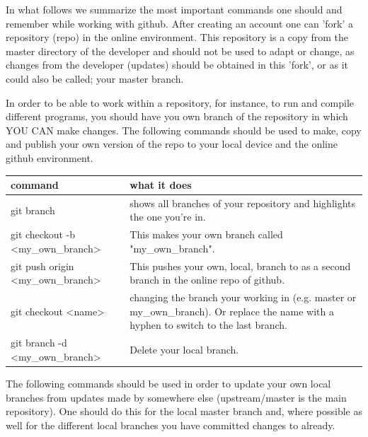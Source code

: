 \newpage
In what follows we summarize the most important commands one should and remember while working with github. After creating an account one can 'fork' a repository (repo) in the online environment. This repository is a copy from the master directory of the developer and should not be used to adapt or change, as changes from the developer (updates) should be obtained in this 'fork', or as it could also be called; your master branch. 
  
In order to be able to work within a repository, for instance, to run and compile different programs, you should have you own branch of the repository in which YOU CAN make changes. The following commands should be used to make, copy and publish your own version of the repo to your local device and the online github environment.

\begin{center}
\begin{tabular}{p{6cm}|p{9cm}}
\textbf{command} &  \textbf{what it does} \\
\hline
  git branch & shows all branches of your repository and highlights the one you're in. \\
  git checkout -b \textless my\_own\_branch\textgreater & This makes your own branch called "my\_own\_branch". \\
  git push origin \textless my\_own\_branch\textgreater & This pushes your own, local, branch to as a second branch in the online repo of github. \\
  git checkout \textless name\textgreater & changing the branch your working in (e.g. master or my\_own\_branch). Or replace the name with a hyphen to switch to the last branch.\\
  git branch -d \textless my\_own\_branch\textgreater & Delete your local branch. \\
  \end{tabular}
\end{center}

  The following commands should be used in order to update your own local branches from updates made by somewhere else (upstream/master is the main repository). One should do this for the local master branch and, where possible as well for the different local branches you have committed changes to already. 

